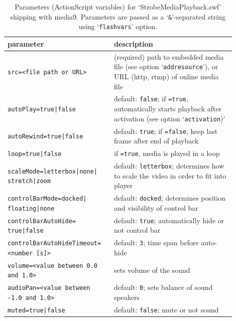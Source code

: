 \documentclass[a4paper]{article}
\begin{document}
\begin{table}[bp]
\centering
\caption{Parameters (ActionScript variables) for `StrobeMediaPlayback.swf' shipping with media9. Parameters are  passed as a `{\tt\&}'-separated string using `{\tt flashvars}' option.}\label{smpparams}
\begin{tabular}[t]{p{0.4\linewidth}p{0.5\linewidth}}\hline
parameter & description\\\hline\hline
{\tt src=<file path or URL>} & (required) path to embedded media file (see option `{\tt addresource}'), or URL (http, rtmp) of online media file\\
{\tt autoPlay=true|false} & default: {\tt false}; if {\tt=true}, automatically starts playback after activation (see option `{\tt activation})'\\
{\tt autoRewind=true|false} & default: {\tt true}; if {\tt=false}, keep last frame after end of playback\\
{\tt loop=true|false} & if {\tt=true}, media is played in a loop\\
{\tt scaleMode=letterbox|none| \phantom{.}\hfill{}stretch|zoom} & default: {\tt letterbox}; determines how to scale the video in order to fit into player\\
{\tt controlBarMode=docked|\phantom{xxxxxxxxxxxxxx} \phantom{.}\hfill{}floating|none} & default: {\tt docked}; determines position and visibility of control bar\\
{\tt controlBarAutoHide=\phantom{xxxxxxx} \phantom{.}\hfill{}true|false} & default: {\tt true}; automatically hide or not control bar\\
{\tt controlBarAutoHideTimeout= \phantom{.}\hfill{}<number [s]>} & default: {\tt 3}; time span before auto-hide\\
{\tt volume=<value between 0.0 \phantom{.}\hfill{}and 1.0>} & sets volume of the sound\\
{\tt audioPan=<value between \phantom{xxxx} \phantom{.}\hfill{}-1.0 and 1.0>} & default: {\tt 0}; sets balance of sound speakers\\
{\tt muted=true|false} & default: {\tt false}; mute or not sound\\
\hline
\end{tabular}
\end{table}
\end{document}
